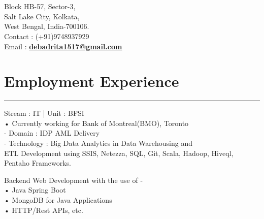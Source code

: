 \documentclass[]{rahulworld-resume}
\begin{document}
\begin{minipage}[t]{0.66\textwidth} 
\hspace*{0pt}\hfill    \\
\hspace*{0pt}\hfill    \\
\hspace*{0pt}\hfill Block HB-57, Sector-3, \\
\hspace*{0pt}\hfill Salt Lake City, Kolkata,\\
\hspace*{0pt}\hfill West Bengal, India-700106. \\
\hspace*{0pt}\hfill Contact : (+91)9748937929 \\
\hspace*{0pt}\hfill Email : \textbf{\href{mailto:debadrita1517@gmail.com}{debadrita1517@gmail.com}}
\section{Employment Experience}
\noindent\rule{12.5cm}{0.4pt}
 
\noindent
\hspace{5em}%
\begin{minipage}{0.85\textwidth\vspace{2pt}}
Stream : IT | Unit : BFSI\\
• Currently working for Bank of Montreal(BMO), Toronto\\
- Domain : IDP AML Delivery\\
- Technology : Big Data Analytics in Data Warehousing and\\ETL Development using SSIS, Netezza, SQL, Git, Scala, Hadoop, Hiveql, Pentaho Frameworks.
\end{minipage}
\sectionsep

 
\noindent
\hspace{5em}%
\begin{minipage}{0.85\textwidth\vspace{2pt}}
Backend Web Development with the use of -\\
• Java Spring Boot\\
• MongoDB for Java Applications\\
• HTTP/Rest APIs, etc.
\end{minipage}
\sectionsep


\end{minipage}
\end{document}
